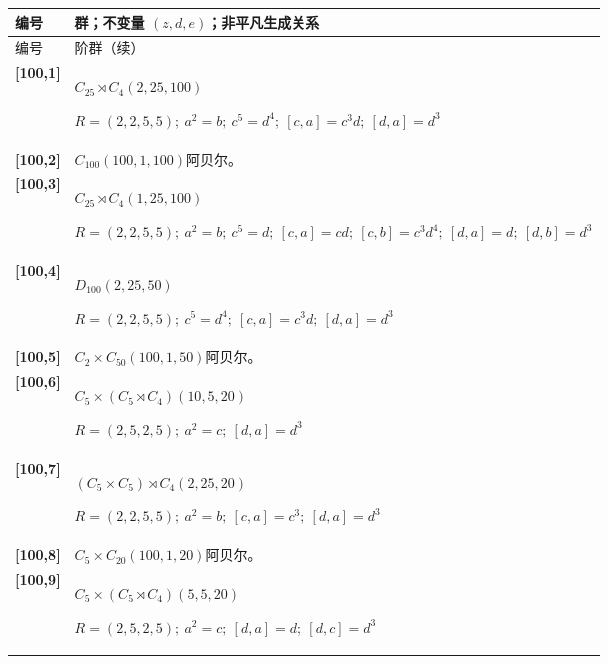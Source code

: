 \documentclass[UTF8,fontset=fandol,11pt,a4paper]{ctexart}
\begin{document}
\begin{longtable}{@{}p{17mm}>{\raggedright\arraybackslash}p{141mm}@{}}

\toprule 编号 & 群；不变量 $(z,d,e)$；非平凡生成关系\\\midrule\endfirsthead

\toprule 编号 & 100 阶群（续）\\\midrule\endhead\bottomrule\endfoot

\textbf{[100,1]} & $C_{25}\rtimes C_{4}$\quad $(2,25,100)$\par\(R=(2,2,5,5);\allowbreak\ a^{2}=b;\allowbreak\ c^{5}=d^{4};\allowbreak\ [c,a]=c^{3}d;\allowbreak\ [d,a]=d^{3}\)\\[3pt]

\textbf{[100,2]} & $C_{100}$\quad $(100,1,100)$\quad 阿贝尔。\\[3pt]

\textbf{[100,3]} & $C_{25}\rtimes C_{4}$\quad $(1,25,100)$\par\(R=(2,2,5,5);\allowbreak\ a^{2}=b;\allowbreak\ c^{5}=d;\allowbreak\ [c,a]=cd;\allowbreak\ [c,b]=c^{3}d^{4};\allowbreak\ [d,a]=d;\allowbreak\ [d,b]=d^{3}\)\\[3pt]

\textbf{[100,4]} & $D_{100}$\quad $(2,25,50)$\par\(R=(2,2,5,5);\allowbreak\ c^{5}=d^{4};\allowbreak\ [c,a]=c^{3}d;\allowbreak\ [d,a]=d^{3}\)\\[3pt]

\textbf{[100,5]} & $C_{2}\times C_{50}$\quad $(100,1,50)$\quad 阿贝尔。\\[3pt]

\textbf{[100,6]} & $C_{5}\times (C_{5}\rtimes C_{4})$\quad $(10,5,20)$\par\(R=(2,5,2,5);\allowbreak\ a^{2}=c;\allowbreak\ [d,a]=d^{3}\)\\[3pt]

\textbf{[100,7]} & $(C_{5}\times C_{5})\rtimes C_{4}$\quad $(2,25,20)$\par\(R=(2,2,5,5);\allowbreak\ a^{2}=b;\allowbreak\ [c,a]=c^{3};\allowbreak\ [d,a]=d^{3}\)\\[3pt]

\textbf{[100,8]} & $C_{5}\times C_{20}$\quad $(100,1,20)$\quad 阿贝尔。\\[3pt]

\textbf{[100,9]} & $C_{5}\times (C_{5}\rtimes C_{4})$\quad $(5,5,20)$\par\(R=(2,5,2,5);\allowbreak\ a^{2}=c;\allowbreak\ [d,a]=d;\allowbreak\ [d,c]=d^{3}\)\\[3pt]


\end{longtable}
\end{document}
